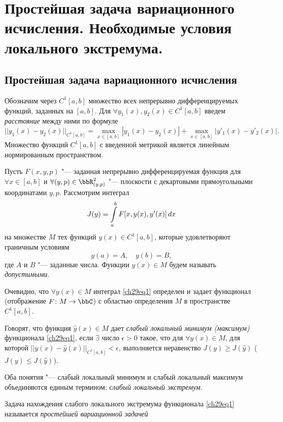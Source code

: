 \chapter{Простейшая задача вариационного исчисления. Необходимые условия локального экстремума.}
\section{Простейшая задача вариационного исчисления} 
Обозначим через $C^1[a,b]$ множество всех непрерывно дифференцируемых функций, заданных на $[a,b]$. Для $\forall y_1(x),y_2(x)\in C^1[a,b]$ введем \textit{расстояние} между ними по формуле
$$
||y_1(x)-y_2(x)||_{C^1[a,b]}=\max_{x\in [a,b]}\limits |y_1(x)-y_2(x)|+\max_{x\in[a,b]}\limits |y'_1(x)-y'_2(x)|. 
$$ 
Множество функций $C^1[a,b]$ с введенной метрикой является линейным нормированным пространством.

Пусть $F(x,y,p)$ "--- заданная непрерывно дифференцируемая функция для $\forall x\in [a,b]$ и $\forall(y,p)\in \bbR^2_{(y,p)}$ "--- плоскости с декартовыми прямоугольными координатами $y,p$. Рассмотрим интеграл
\begin{equation}\label{ch29eq1}
J(y)=\int_a^b\limits F[x,y(x),y'(x)]\,dx
\end{equation}
на множестве $M$ тех функций $y(x)\in C^1[a,b]$, которые удовлетворяют граничным условиям
\begin{equation}\label{ch29eq2}
y(a)=A,\quad y(b)=B,
\end{equation}
где $A$ и $B$ "--- заданные числа. Функции $y(x)\in M$ будем называть \textit{допустимыми}.

Очевидно, что $\forall y(x)\in M$ интеграл \eqref{ch29eq1} определен и задает функционал (отображение $F \colon M \to \bbC$) с областью определения $M$ в пространстве $C^1[a,b]$.

\begin{defn}
Говорят, что функция $\hat{y}(x)\in M$ дает \textit{слабый локальный минимум (максимум)} функционала \eqref{ch29eq1}, если $\exists$ число $\epsilon>0$ такое, что для $\forall y(x)\in M$, для которой $||y(x)-\hat{y}(x)||_{C^1[a,b]}<\epsilon$, выполняется неравенство $J(y)\geq J(\hat{y})$ ($J(y)\le J(\hat{y})$).
\end{defn}

Оба понятия "--- слабый локальный минимум и слабый локальный максимум объединяются единым термином: \textit{слабый локальный экстремум}.

\begin{defn}
Задача нахождения слабого локального экстремума функционала \eqref{ch29eq1} называется \textit{простейшей вариационной задачей}
\end{defn}

